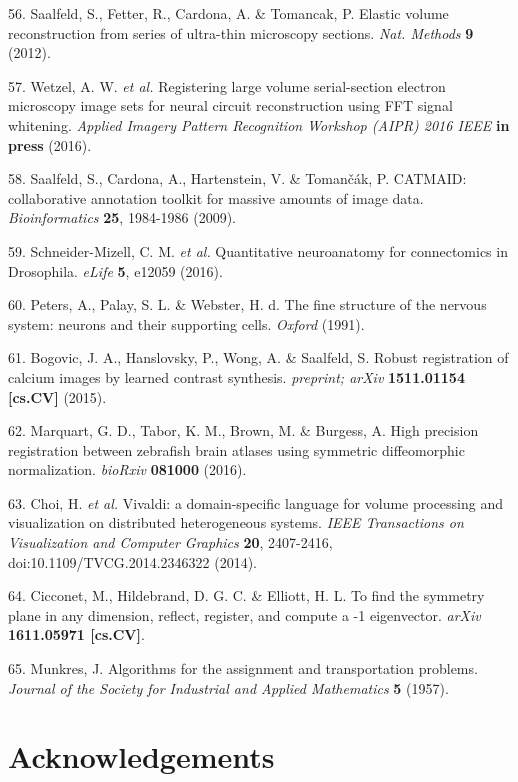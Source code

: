 \documentclass{article}
\begin{document}
\begin{hangpars}
56. Saalfeld, S., Fetter, R., Cardona, A. \& Tomancak, P. Elastic volume reconstruction from series of ultra-thin microscopy sections. \textit{Nat. Methods} \textbf{9} (2012).

57. Wetzel, A. W.\textit{ et al.} Registering large volume serial-section electron microscopy image sets for neural circuit reconstruction using FFT signal whitening. \textit{Applied Imagery Pattern Recognition Workshop (AIPR) 2016 IEEE} \textbf{in press} (2016).

58. Saalfeld, S., Cardona, A., Hartenstein, V. \& Tomančák, P. CATMAID: collaborative annotation toolkit for massive amounts of image data. \textit{Bioinformatics} \textbf{25}, 1984-1986 (2009).

59. Schneider-Mizell, C. M.\textit{ et al.} Quantitative neuroanatomy for connectomics in Drosophila. \textit{eLife} \textbf{5}, e12059 (2016).

60. Peters, A., Palay, S. L. \& Webster, H. d. The fine structure of the nervous system: neurons and their supporting cells. \textit{Oxford} (1991).

61. Bogovic, J. A., Hanslovsky, P., Wong, A. \& Saalfeld, S. Robust registration of calcium images by learned contrast synthesis. \textit{preprint; arXiv} \textbf{1511.01154 [cs.CV]} (2015).

62. Marquart, G. D., Tabor, K. M., Brown, M. \& Burgess, A. High precision registration between zebrafish brain atlases using symmetric diffeomorphic normalization. \textit{bioRxiv} \textbf{081000} (2016).


63. Choi, H.\textit{ et al.} Vivaldi: a domain-specific language for volume processing and visualization on distributed heterogeneous systems. \textit{IEEE Transactions on Visualization and Computer Graphics} \textbf{20}, 2407-2416, doi:10.1109/TVCG.2014.2346322 (2014).

64. Cicconet, M., Hildebrand, D. G. C. \& Elliott, H. L. To find the symmetry plane in any dimension, reflect, register, and compute a -1 eigenvector. \textit{arXiv} \textbf{1611.05971 [cs.CV]}.

65. Munkres, J. Algorithms for the assignment and transportation problems. \textit{Journal of the Society for Industrial and Applied Mathematics} \textbf{5} (1957).
\end{hangpars}


\section*{Acknowledgements}
\end{document}
